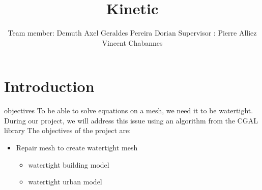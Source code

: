 \documentclass[10pt]{beamer}
\title{Kinetic}
\author{Team member: \newline\newline Demuth Axel \newline Geraldes Pereira Dorian \newline\newline Supervisor :  \newline\newline Pierre Alliez \newline Vincent Chabannes}
\date{}
\begin{document}
\frame{\titlepage}
\begin{frame}
    \tableofcontents
\end{frame}
\section{Introduction}

\begin{frame}[plain]{objectives}
    To be able to solve equations on a mesh, we need it to be watertight. During our project, we will address this issue using an algorithm from the CGAL library
    \newline\newline The objectives of the project are:
    \newline
    \begin{itemize}
        \item Repair mesh to create watertight mesh
        \newline
        \begin{itemize}
            \item watertight building model
            \newline
            \item watertight urban model
        \end{itemize}

    \end{itemize}
\end{frame}
\end{document}
